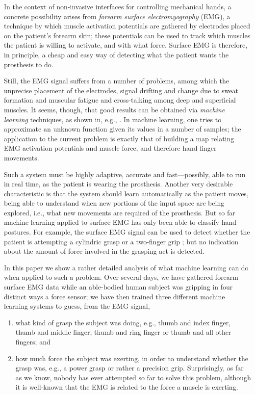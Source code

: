 In the context of non-invasive interfaces for controlling mechanical
hands, a concrete possibility arises from \emph{forearm surface
electromyography} (EMG), a technique by which muscle
activation potentials are gathered by electrodes placed on the
patient's forearm skin; these potentials can be used to track which
muscles the patient is willing to activate, and with what force.
Surface EMG is therefore, in principle, a cheap and easy way of
detecting what the patient wants the prosthesis to do.

Still, the EMG signal suffers from a number of problems, among which
the unprecise placement of the electrodes, signal drifting and change
due to sweat formation and muscular fatigue and cross-talking among
deep and superficial muscles. It seems, though, that good results can
be obtained via \emph{machine learning} techniques, as shown in, e.g.,
\cite{smagt}. In machine learning, one tries to approximate an unknown
function given its values in a number of samples; the application to
the current problem is exactly that of building a map relating EMG
activation potentials and muscle force, and therefore hand finger
movements.

Such a system must be highly adaptive, accurate and fast---possibly,
able to run in real time, as the patient is wearing the prosthesis.
Another very desirable characteristic is that the system should learn
automatically as the patient moves, being able to understand when new
portions of the input space are being explored, i.e., what new
movements are required of the prosthesis. But so far machine learning
applied to surface EMG has only been able to classify hand postures.
For example, the surface EMG signal can be used to detect whether the
patient is attempting a cylindric grasp or a two-finger grip
\cite{ekvall}; but no indication about the amount of force involved in
the grasping act is detected.

In this paper we show a rather detailed analysis of what machine
learning can do when applied to such a problem. Over several days, we have
gathered forearm surface EMG data while an able-bodied human subject
was gripping in four distinct ways a force sensor; we have then
trained three different machine learning systems to guess, from the
EMG signal,
\begin{enumerate}

  \item what kind of grasp the subject was doing, e.g., thumb and
    index finger, thumb and middle finger, thumb and ring finger or
    thumb and all other fingers; and

  \item how much force the subject was exerting, in order to
    understand whether the grasp was, e.g., a power grasp or rather a
    precision grip. Surprisingly, as far as we know, nobody has ever
    attempted so far to solve this problem, although it is well-known
    that the EMG is related to the force a muscle is exerting.

\end{enumerate}

